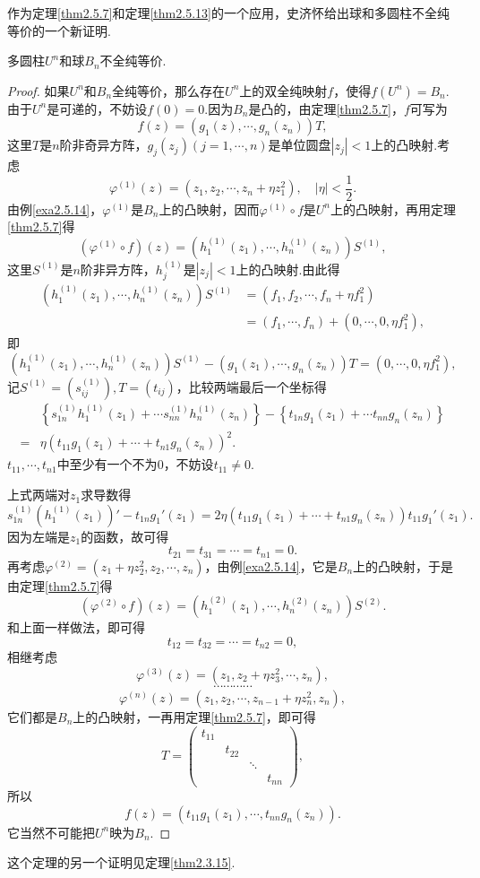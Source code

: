 作为定理\ref{thm2.5.7}和定理\ref{thm2.5.13}的一个应用，史济怀\cite{史济怀1981new}给出球和多圆柱不全纯等价的一个新证明.
\begin{theorem}\label{thm2.5.15}
	多圆柱$U^n$和球$B_n$不全纯等价.
\end{theorem}
\begin{proof}
	如果$U^n$和$B_n$全纯等价，那么存在$U^n$上的双全纯映射$f$，使得$f(U^n)=B_n$.由于$U^n$是可递的，不妨设$f(0)=0$.因为$B_n$是凸的，由定理\ref{thm2.5.7}，$f$可写为
	\[f(z)=(g_1(z),\cdots,g_n(z_n))T,\]
	这里$T$是$n$阶非奇异方阵，$g_j(z_j)(j=1,\cdots,n)$是单位圆盘$|z_j|<1$上的凸映射.考虑
	\[\varphi^{(1)}(z)=(z_1,z_2,\cdots,z_n+\eta z_1^2),\quad |\eta|<\frac12.\]
	由例\ref{exa2.5.14}，$\varphi^{(1)}$是$B_n$上的凸映射，因而$\varphi^{(1)}\circ f$是$U^n$上的凸映射，再用定理\ref{thm2.5.7}得
	\[(\varphi^{(1)}\circ f)(z)=(h_1^{(1)}(z_1),\cdots,h_n^{(1)}(z_n))S^{(1)},\]
	这里$S^{(1)}$是$n$阶非异方阵，$h_j^{(1)}$是$|z_j|<1$上的凸映射.由此得
	\begin{align*}
		(h_1^{(1)}(z_1),\cdots,h_n^{(1)}(z_n))S^{(1)}
		&=(f_1,f_2,\cdots,f_n+\eta f_1^2)\\
		&=(f_1,\cdots,f_n)+(0,\cdots,0,\eta f_1^2),
	\end{align*}
即
\[(h_1^{(1)}(z_1),\cdots,h_n^{(1)}(z_n))S^{(1)}-(g_1(z_1),\cdots,g_n(z_n))T=(0,\cdots,0,\eta f_1^2),\]
记$S^{(1)}=(s_{ij}^{(1)}),T=(t_{ij})$，比较两端最后一个坐标得
\begin{align*}
	&\left\{s_{1n}^{(1)}h_1^{(1)}(z_1)+\cdots s_{nn}^{(1)}h_n^{(1)}(z_n)\right\}-\left\{t_{1n}g_1(z_1)+\cdots t_{nn}g_n(z_n)\right\}\\
	=&\eta(t_{11}g_1(z_1)+\cdots+t_{n1}g_n(z_n))^2.
\end{align*}
$t_{11},\cdots,t_{n1}$中至少有一个不为$0$，不妨设$t_{11}\neq0$.

上式两端对$z_1$求导数得
\[s_{1n}^{(1)}(h_1^{(1)}(z_1))'-t_{1n}g_1'(z_1)=2\eta(t_{11}g_1(z_1)+\cdots+t_{n1}g_n(z_n))t_{11}g_1'(z_1).\]
因为左端是$z_1$的函数，故可得
\[t_{21}=t_{31}=\cdots=t_{n1}=0.\]
再考虑$\varphi^{(2)}=(z_1+\eta z_2^2,z_2,\cdots,z_n)$，由例\ref{exa2.5.14}，它是$B_n$上的凸映射，于是由定理\ref{thm2.5.7}得
\[(\varphi^{(2)}\circ f)(z)=(h_1^{(2)}(z_1),\cdots,h_n^{(2)}(z_n))S^{(2)}.\]
和上面一样做法，即可得
\[t_{12}=t_{32}=\cdots=t_{n2}=0,\]
相继考虑
\[\varphi^{(3)}(z)=(z_1,z_2+\eta z_3^2,\cdots,z_n),\]
\[\cdots\cdots\cdots\cdots\]
\[\varphi^{(n)}(z)=(z_1,z_2,\cdots,z_{n-1}+\eta z_n^2,z_n),\]
它们都是$B_n$上的凸映射，一再用定理\ref{thm2.5.7}，即可得
\[T=\begin{pmatrix}
	t_{11} & & & \\
	 & t_{22} & & \\
	 & & \ddots&\\
	 & & &t_{nn}
\end{pmatrix},\]
所以
\[f(z)=(t_{11}g_1(z_1),\cdots,t_{nn}g_n(z_n)).\]
它当然不可能把$U^n$映为$B_n$.
\end{proof}
这个定理的另一个证明见定理\ref{thm2.3.15}.
